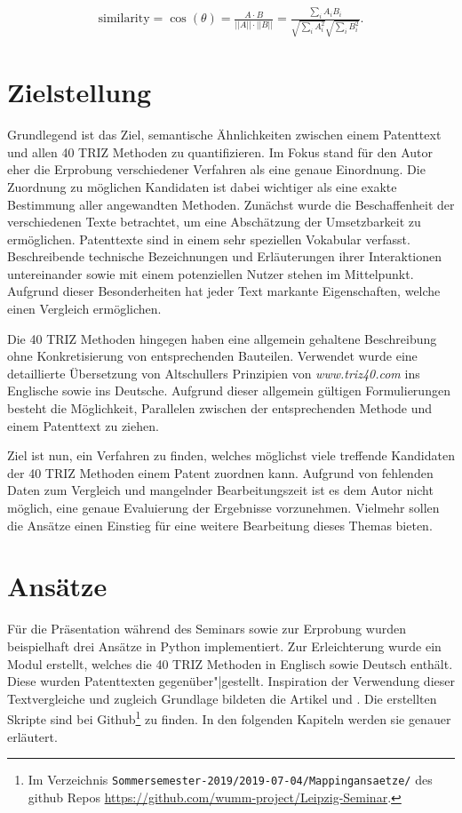 \documentclass[11pt,a4paper]{article}
\begin{document}
\begin{gather*}
  \text{similarity}=\cos(\theta)=\frac{A\cdot B}{||A||\cdot ||B||} =
  \frac{\sum_i{A_iB_i}}{\sqrt{\sum_i{A_i^2}}\sqrt{\sum_i{B_i^2}}}.
\end{gather*}

\section{Zielstellung}
Grundlegend ist das Ziel, semantische Ähnlichkeiten zwischen einem Patenttext
und allen 40 TRIZ Methoden zu quantifizieren.  Im Fokus stand für den Autor
eher die Erprobung verschiedener Verfahren als eine genaue Einordnung.  Die
Zuordnung zu möglichen Kandidaten ist dabei wichtiger als eine exakte
Bestimmung aller angewandten Methoden.  Zunächst wurde die Beschaffenheit der
verschiedenen Texte betrachtet, um eine Abschätzung der Umsetzbarkeit zu
ermöglichen.  Patenttexte sind in einem sehr speziellen Vokabular verfasst.
Beschreibende technische Bezeichnungen und Erläuterungen ihrer Interaktionen
untereinander sowie mit einem potenziellen Nutzer stehen im Mittelpunkt.
Aufgrund dieser Besonderheiten hat jeder Text markante Eigenschaften, welche
einen Vergleich ermöglichen.

Die 40 TRIZ Methoden hingegen haben eine allgemein gehaltene Beschreibung ohne
Konkretisierung von entsprechenden Bauteilen.  Verwendet wurde eine
detaillierte Übersetzung von Altschullers Prinzipien von
\textit{www.triz40.com} \cite{triz40.com} ins Englische sowie ins Deutsche.
Aufgrund dieser allgemein gültigen Formulierungen besteht die Möglichkeit,
Parallelen zwischen der entsprechenden Methode und einem Patenttext zu ziehen.

Ziel ist nun, ein Verfahren zu finden, welches möglichst viele treffende
Kandidaten der 40 TRIZ Methoden einem Patent zuordnen kann.  Aufgrund von
fehlenden Daten zum Vergleich und mangelnder Bearbeitungszeit ist es dem Autor
nicht möglich, eine genaue Evaluierung der Ergebnisse vorzunehmen.  Vielmehr
sollen die Ansätze einen Einstieg für eine weitere Bearbeitung dieses Themas
bieten. 

\section{Ansätze}

Für die Präsentation während des Seminars sowie zur Erprobung wurden
beispielhaft drei Ansätze in Python implementiert.  Zur Erleichterung wurde
ein Modul erstellt, welches die 40 TRIZ Methoden in Englisch sowie Deutsch
enthält.  Diese wurden Patenttexten gegenüber"|gestellt.  Inspiration der
Verwendung dieser Textvergleiche und zugleich Grundlage bildeten die Artikel
\cite{Maali2016} und \cite{siegmeduim}.  Die erstellten Skripte sind bei
Github\footnote{Im Verzeichnis
  \texttt{Sommersemester-2019/2019-07-04/Mappingansaetze/} des github Repos
  \url{https://github.com/wumm-project/Leipzig-Seminar}.} zu finden.  In den
folgenden Kapiteln werden sie genauer erläutert.
\end{document}
